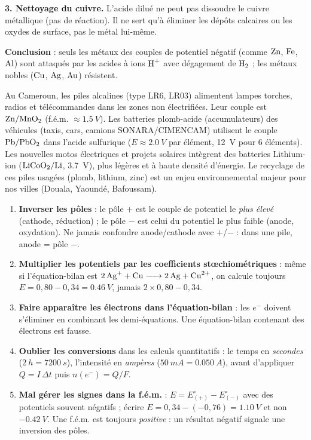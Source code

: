 \documentclass[11pt]{article}
\begin{document}
\begin{exoresolu}
\textbf{3. Nettoyage du cuivre.} L'acide dilué ne peut pas dissoudre le cuivre métallique (pas de réaction). Il ne sert qu'à éliminer les dépôts calcaires ou les oxydes de surface, pas le métal lui-même.

\textbf{Conclusion} : seuls les métaux des couples de potentiel négatif (comme $\ce{Zn}$, $\ce{Fe}$, $\ce{Al}$) sont attaqués par les acides à ions $\ce{H+}$ avec dégagement de $\ce{H2}$ ; les métaux \og nobles \fg{} ($\ce{Cu}$, $\ce{Ag}$, $\ce{Au}$) résistent.
\end{exoresolu}

\begin{savaistu}
Au Cameroun, les piles alcalines (type LR6, LR03) alimentent lampes torches, radios et télécommandes dans les zones non électrifiées. Leur couple est $\ce{Zn}/\ce{MnO2}$ (f.é.m. $\approx \SI{1,5}{V}$). Les batteries plomb-acide (accumulateurs) des véhicules (taxis, cars, camions SONARA/CIMENCAM) utilisent le couple $\ce{Pb}/\ce{PbO2}$ dans l'acide sulfurique ($E \approx \SI{2,0}{V}$ par élément, \SI{12}{V} pour 6 éléments). Les nouvelles motos électriques et projets solaires intègrent des batteries Lithium-ion ($\ce{LiCoO2}/\ce{Li}$, \SI{3,7}{V}), plus légères et à haute densité d'énergie. Le recyclage de ces piles usagées (plomb, lithium, zinc) est un enjeu environnemental majeur pour nos villes (Douala, Yaoundé, Bafoussam).
\end{savaistu}

\begin{attention}
\begin{enumerate}
\item \textbf{Inverser les pôles} : le pôle $+$ est le couple de potentiel le \emph{plus élevé} (cathode, réduction) ; le pôle $-$ est celui du potentiel le plus faible (anode, oxydation). Ne jamais confondre anode/cathode avec $+$/$-$ : dans une pile, anode = pôle $-$.
\item \textbf{Multiplier les potentiels par les coefficients stœchiométriques} : même si l'équation-bilan est $\ce{2Ag+ + Cu -> 2Ag + Cu^2+}$, on calcule toujours $E = 0,80 - 0,34 = \SI{0,46}{V}$, jamais $2 \times 0,80 - 0,34$.
\item \textbf{Faire apparaître les électrons dans l'équation-bilan} : les $e^-$ doivent s'éliminer en combinant les demi-équations. Une équation-bilan contenant des électrons est fausse.
\item \textbf{Oublier les conversions} dans les calculs quantitatifs : le temps en \emph{secondes} ($\SI{2}{h} = \SI{7200}{s}$), l'intensité en \emph{ampères} ($\SI{50}{mA} = \SI{0,050}{A}$), avant d'appliquer $Q = I\,\Delta t$ puis $n(e^-) = Q/F$.
\item \textbf{Mal gérer les signes dans la f.é.m.} : $E = E^{\circ}_{(+)} - E^{\circ}_{(-)}$ avec des potentiels souvent négatifs ; écrire $E = 0,34 - (-0,76) = \SI{1,10}{V}$ et non $\SI{-0,42}{V}$. Une f.é.m. est toujours \emph{positive} : un résultat négatif signale une inversion des pôles.
\end{enumerate}
\end{attention}
\end{document}
